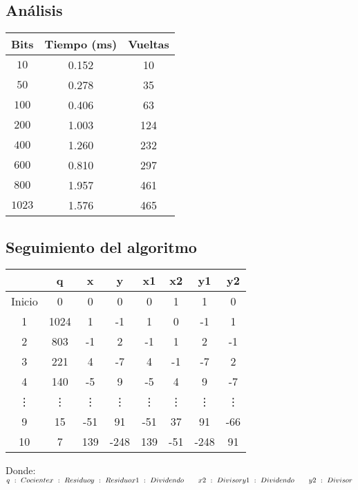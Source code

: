 \documentclass[11pt, conference]{IEEEtran}
\begin{document}
\subsection{Análisis}
\begin{center}
	\begin{tabular}{|c|c|c|}
		\hline
		\textbf{Bits}& {\bf Tiempo} (ms) & {\bf Vueltas} \\	\hline
		$10$ & 0.152 & 10\\ \hline
		$50$ & 0.278 & 35 \\ \hline
		$100$ & 0.406 & 63 \\ \hline
		$200$ & 1.003 & 124 \\ \hline
		$400$ & 1.260 & 232 \\ \hline
		$600$ & 0.810 & 297 \\ \hline
		$800$ & 1.957 & 461 \\ \hline
		$1023$ & 1.576 & 465 \\ \hline
	\end{tabular}
\end{center}

\subsection{Seguimiento del algoritmo}

\begin{center}
	\begin{tabular}{|c|c|c|c|c|c|c|c|}
		\hline
		   & \textbf{q} & \textbf{x} & \textbf{y} & \textbf{x1} & \textbf{x2}& \textbf{y1}& \textbf{y2} \\	\hline
		Inicio &  0 & 0 & 0 & 0 & 1 & 1 & 0\\ \hline
		1 & 1024 & 1 & -1 & 1 & 0 & -1 & 1\\ \hline
		2 & 803  & -1 & 2 & -1 & 1 & 2 & -1\\ \hline
		3 & 221  & 4 & -7 & 4 & -1 & -7 & 2\\ \hline
		4 & 140  & -5 & 9 & -5 & 4 & 9 & -7\\ \hline
		\vdots  & \vdots & \vdots & \vdots& \vdots& \vdots& \vdots& \vdots \\ \hline
		9 & 15  & -51 & 91 & -51 & 37 & 91 & -66\\ \hline
		10& 7  & 139 & -248 & 139 & -51 & -248 & 91\\ \hline
	\end{tabular}
\end{center}
Donde:\\
$
q\ :\ Cociente \\
x\ :\ Residuo \\
y\ :\ Residuo \\
x1\ :\ Dividendo \qquad x2\ :\ Divisor \\
y1\ :\ Dividendo \qquad y2\ :\ Divisor \\
$
\end{document}
